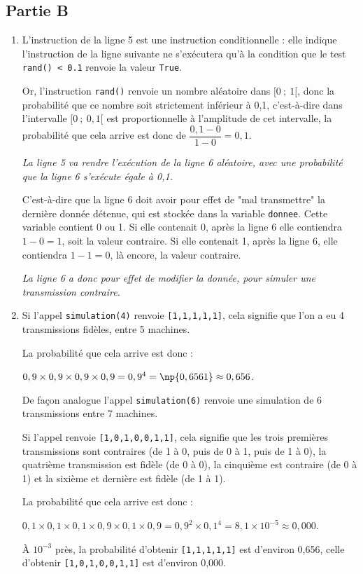 \subsection*{Partie B}

\begin{enumerate}
	\item L'instruction de la ligne 5 est une instruction conditionnelle : elle indique l'instruction de la ligne suivante ne s'exécutera qu'à la condition que le test \texttt{rand() < 0.1} renvoie la valeur \texttt{True}.

Or, l'instruction \texttt{rand()} renvoie un nombre aléatoire dans $[0~;~1[$, donc la probabilité que ce nombre soit strictement inférieur à 0,1, c'est-à-dire dans l'intervalle $[0~;~0,1[$ est proportionnelle à l'amplitude de cet intervalle, la probabilité que cela arrive est donc de $\dfrac{0,1 - 0}{1 - 0} = 0,1$.

\emph{La ligne 5 va rendre l'exécution de la ligne 6 aléatoire, avec une probabilité que la ligne 6 s'exécute égale à 0,1.}

C'est-à-dire que la ligne 6 doit avoir pour effet de "mal transmettre" la dernière donnée détenue, qui est stockée dans la variable \texttt{donnee}. Cette variable contient 0 ou 1. Si elle contenait 0, après la ligne 6 elle contiendra $1 - 0 = 1$, soit la valeur contraire. Si elle contenait 1, après la ligne 6, elle contiendra $1 - 1 = 0$, là encore, la valeur contraire.

\emph{La ligne 6 a donc pour effet de modifier la donnée, pour simuler une transmission contraire.}

	\item Si l'appel \texttt{simulation(4)} renvoie \texttt{[1,1,1,1,1]}, cela signifie que l'on a eu 4 transmissions fidèles, entre 5 machines.

La probabilité que cela arrive est donc  :

$0,9 \times 0,9 \times 0,9 \times 0,9 = 0,9^{4} = \np{0,6561}\approx 0,656$.

De façon analogue l'appel \texttt{simulation(6)} renvoie une simulation de 6 transmissions entre 7 machines.

Si l'appel renvoie \texttt{[1,0,1,0,0,1,1]}, cela signifie que les trois premières transmissions sont contraires (de 1 à 0, puis de 0 à 1, puis de 1 à 0), la quatrième transmission est fidèle (de 0 à 0), la cinquième est contraire (de 0 à 1) et la sixième et dernière est fidèle (de 1 à 1).

La probabilité que cela arrive est donc  :

$0,1 \times 0,1 \times 0,1 \times 0,9 \times 0,1 \times 0,9 = 0,9^{2}\times 0,1^{4} = 8,1\times 10^{-5}\approx 0,000$.

À $10^{-3}$ près, la probabilité d'obtenir \texttt{[1,1,1,1,1]} est d'environ 0,656, celle d'obtenir \texttt{[1,0,1,0,0,1,1]} est d'environ 0,000.
\end{enumerate}
